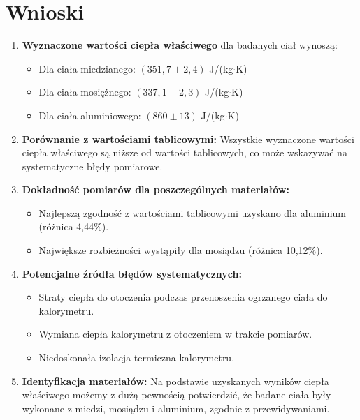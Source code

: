 \documentclass[a4paper,12pt]{article}
\begin{document}
\section{Wnioski}


\begin{enumerate}
    \item \textbf{Wyznaczone wartości ciepła właściwego} dla badanych ciał wynoszą:
          \begin{itemize}
              \item Dla ciała miedzianego: $(351{,}7 \pm 2{,}4)$ J/(kg$\cdot$K)
              \item Dla ciała mosiężnego: $(337{,}1 \pm 2{,}3)$ J/(kg$\cdot$K)
              \item Dla ciała aluminiowego: $(860 \pm 13)$ J/(kg$\cdot$K)
          \end{itemize}


    \item \textbf{Porównanie z wartościami tablicowymi:} Wszystkie wyznaczone wartości ciepła właściwego są niższe od wartości tablicowych, co może wskazywać na systematyczne błędy pomiarowe.

    \item \textbf{Dokładność pomiarów dla poszczególnych materiałów:}
          \begin{itemize}
              \item Najlepszą zgodność z wartościami tablicowymi uzyskano dla aluminium (różnica 4,44\%).
              \item Największe rozbieżności wystąpiły dla mosiądzu (różnica 10,12\%).
          \end{itemize}

    \item \textbf{Potencjalne źródła błędów systematycznych:}
          \begin{itemize}
              \item Straty ciepła do otoczenia podczas przenoszenia ogrzanego ciała do kalorymetru.
              \item Wymiana ciepła kalorymetru z otoczeniem w trakcie pomiarów.
              \item Niedoskonała izolacja termiczna kalorymetru.
          \end{itemize}

    \item \textbf{Identyfikacja materiałów:} Na podstawie uzyskanych wyników ciepła właściwego możemy z dużą pewnością potwierdzić, że badane ciała były wykonane z miedzi, mosiądzu i aluminium, zgodnie z przewidywaniami.

\end{enumerate}
\end{document}
